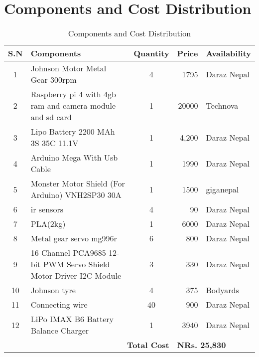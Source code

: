 \section*{Components and Cost Distribution}
\begin{table}[h]
\centering
\begin{tabular}{|c|l|c|r|l|}
\hline
\textbf{S.N} & \textbf{Components} & \textbf{Quantity} & \textbf{Price} & \textbf{Availability} \\
\hline
1 & Johnson Motor Metal Gear 300rpm & 4 & 1795 & Daraz Nepal \\
\hline
2 & Raspberry pi 4 with 4gb ram and camera module and sd card & 1 & 20000 & Technova \\
\hline
3 & Lipo Battery 2200 MAh 3S 35C 11.1V & 1 & 4,200 & Daraz Nepal \\
\hline
4 & Arduino Mega With Usb Cable & 1 & 1990 & Daraz Nepal \\
\hline
5 & Monster Motor Shield (For Arduino) VNH2SP30 30A & 1 & 1500 &  giganepal \\
\hline 
6 & ir sensors & 4 & 90 & Daraz Nepal \\
\hline
7 & PLA(2kg) & 1 & 6000 & Daraz Nepal \\
\hline
8 & Metal gear servo mg996r & 6 & 800 & Daraz Nepal \\
\hline
9 & 16 Channel PCA9685 12-bit PWM Servo Shield Motor Driver I2C Module  & 3 & 330 & Daraz Nepal \\
\hline
10 & Johnson tyre & 4 & 375 & Bodyards  \\
\hline
11 & Connecting wire & 40 & 900 & Daraz Nepal \\
\hline
12 & LiPo IMAX B6 Battery Balance Charger & 1 & 3940 & Daraz Nepal \\
\hline
\multicolumn{3}{|r|}{\textbf{Total Cost}} & \multicolumn{2}{l|}{\textbf{NRs. 25,830}} \\
\hline
\end{tabular}
\caption{Components and Cost Distribution}
\end{table}